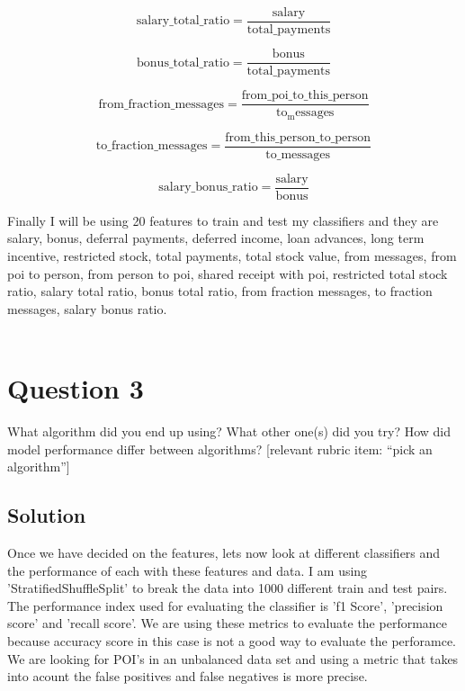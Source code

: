 \documentclass[12pt]{article}%
\begin{document}
\begin{equation}
\mathrm{salary\_total\_ratio} = \frac{\mathrm{salary}}{\mathrm{total\_payments}}
\end{equation}

\begin{equation}
\mathrm{bonus\_total\_ratio} = \frac{\mathrm{bonus}}{\mathrm{total\_payments}}
\end{equation}

\begin{equation}
\mathrm{from\_fraction\_messages} = \frac{\mathrm{from\_poi\_to\_this\_person}}{\mathrm{to_messages}}
\end{equation}

\begin{equation}
\mathrm{to\_fraction\_messages} = \frac{\mathrm{from\_this\_person\_to\_person}}{\mathrm{to\_messages}}
\end{equation}

\begin{equation}
\mathrm{salary\_bonus\_ratio} = \frac{\mathrm{salary}}{\mathrm{bonus}}
\end{equation}

Finally I will be using 20 features to train and test my classifiers and they are salary, bonus, deferral payments, deferred income, loan advances, long term incentive, restricted stock, total payments, total stock value, from messages, from poi to person, from person to poi, shared receipt with poi, restricted total stock ratio, salary total ratio, bonus total ratio, from fraction messages, to fraction messages, salary bonus ratio.
\\
\\

\section*{Question 3}
What algorithm did you end up using? What other one(s) did you try? How did model performance differ between algorithms?  [relevant rubric item: “pick an algorithm”]

\subsection*{Solution}

Once we have decided on the features, lets now look at different classifiers and the performance of each with these features and data. I am using 'StratifiedShuffleSplit' to break the data into 1000 different train and test pairs. The performance index used for evaluating the classifier is 'f1 Score', 'precision score' and 'recall score'. We are using these metrics to evaluate the performance because accuracy score in this case is not a good way to evaluate the perforamce. We are looking for POI's in an unbalanced data set and using a metric that takes into acount the false positives and false negatives is more precise.
\end{document}
